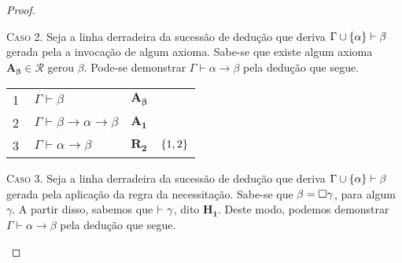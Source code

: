 \begin{tcolorbox}[enhanced jigsaw, breakable, sharp corners, colframe=black, colback=white, boxrule=0.5pt, left=1.5mm, right=1.5mm, top=1.5mm, bottom=1.5mm]
\begin{theorem}[Dedução]
\begin{proof}
        \begin{case}
        \vspace{\baselineskip}
        \textsc{Caso 2.}
        Seja a linha derradeira da sucessão de dedução que deriva $\Gamma\cup\left\{\alpha\right\}\vdash\beta$ gerada pela a invocação de algum axioma.
        Sabe-se que existe algum axioma $\mathbf{A_\beta}\in\mathcal{R}$ gerou $\beta$.
        Pode-se demonstrar $\Gamma\vdash\alpha\to\beta$ pela dedução que segue.

        \vspace{0.5\baselineskip}
        \footnotesize
        \setlength{\rowskip}{0.5\baselineskip}
        \begin{xltabular}{\textwidth}{r | X l l}
            \scriptsize{\phantom{0}1}\phantom{ } & $\ \Gamma\vdash\beta$                  & $\mathbf{A_\beta}$\phantom{1}            & \\[\rowskip]
            \scriptsize{\phantom{0}2}\phantom{ } & $\ \Gamma\vdash\beta\to\alpha\to\beta$ & \hyperref[modal.axiom.1]{$\mathbf{A_1}$} & \\[\rowskip]
            \scriptsize{\phantom{0}3}\phantom{ } & $\ \Gamma\vdash\alpha\to\beta$         & $\hyperref[modal.rule.2]{\mathbf{R_2}}$  & $\left\{1,2\right\}$
        \end{xltabular}
        \normalsize
        \end{case}

        \begin{case}
        \vspace{\baselineskip}
        \textsc{Caso 3.}
        Seja a linha derradeira da sucessão de dedução que deriva $\Gamma\cup\left\{\alpha\right\}\vdash\beta$ gerada pela aplicação da regra da necessitação.
        Sabe-se que $\beta=\Box\gamma$, para algum $\gamma$.
        A partir disso, sabemos que ${\mathrel{\vdash}\gamma}$, dito $\mathbf{H_1}$.
        Deste modo, podemos demonstrar $\Gamma\vdash\alpha\to\beta$ pela dedução que segue.
        \end{case}


\end{proof}
\end{theorem}
\end{tcolorbox}
